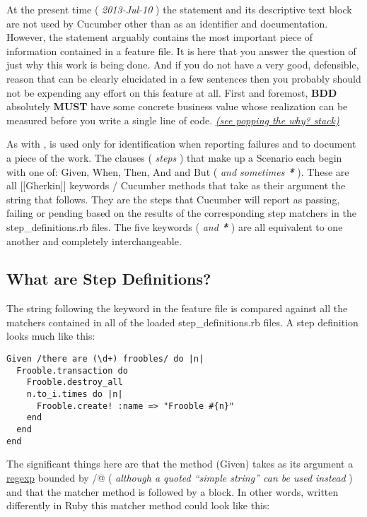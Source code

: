 \documentclass[10pt]{book}
\begin{document}
At the present time ( \emph{2013-Jul-10} ) the \verb@Feature@ statement and its descriptive text block are not used by Cucumber other than as an identifier and documentation.  However, the \verb@Feature@ statement arguably contains the most important piece of information contained in a feature file.  It is here that you answer the question of just why this work is being done.  And if you do not have a very good, defensible, reason that can be clearly elucidated in a few sentences then you probably should not be expending any effort on this feature at all.  First and foremost, \textbf{BDD} absolutely \textbf{MUST} have some concrete business value whose realization can be measured before you write a single line of code. \emph{\href{http://www.mattblodgett.com/2009/01/pop-stack.html}{(see popping the why? stack)}}

As with \verb@Feature@, \verb@Scenario@ is used only for identification when reporting failures and to document a piece of the work.  The clauses ( \emph{steps} ) that make up a Scenario each begin with one of: Given, When, Then, And and But ( \emph{ and sometimes \textbf{*}} ).  These are all [[Gherkin]] keywords / Cucumber methods that take as their argument the string that follows.  They are the steps that Cucumber will report as passing, failing or pending based on the results of the corresponding step matchers in the step\_definitions.rb files.  The five keywords ( \emph{ and \textbf{*}} ) are all equivalent to one another and completely interchangeable.

\subsection{What are Step Definitions?}

The string following the keyword in the feature file is compared against all the matchers contained in all of the loaded step\_definitions.rb files.  A step definition looks much like this:
\begin{verbatim}
Given /there are (\d+) froobles/ do |n|
  Frooble.transaction do
    Frooble.destroy_all
    n.to_i.times do |n|
      Frooble.create! :name => "Frooble #{n}"
    end
  end
end

\end{verbatim}

The significant things here are that the method (Given) takes as its argument a \href{http://en.wikipedia.org/wiki/Regexp}{regexp} bounded by  \verb@/@ ( \emph{although a quoted ``simple string'' can be used instead} ) and that the matcher method is followed by a block.  In other words, written differently in Ruby this matcher method could look like this:
\end{document}
